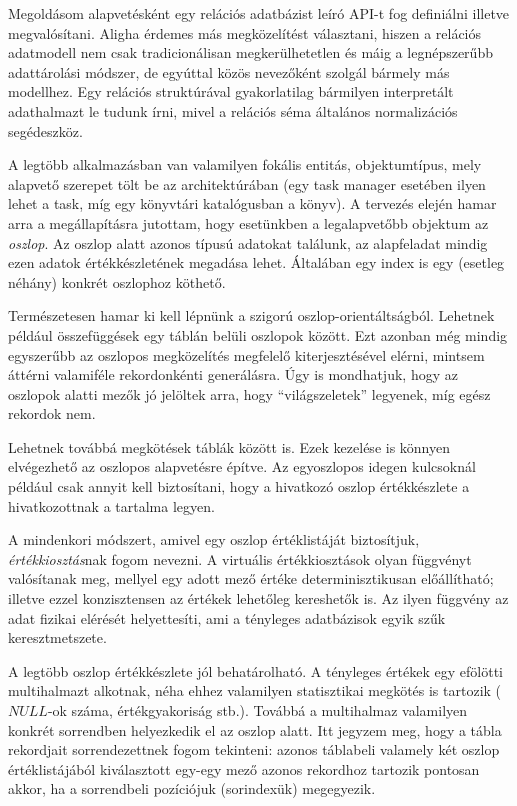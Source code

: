 \documentclass[
    parspace,
    noindent,
    nohyp,
]{elteiktdk}[2023/04/10]
\begin{document}
Megoldásom alapvetésként egy relációs adatbázist leíró API-t fog definiálni illetve megvalósítani.
Aligha érdemes más megközelítést választani,
hiszen a relációs adatmodell nem csak tradicionálisan megkerülhetetlen
és máig a legnépszerűbb adattárolási módszer\cite{Akhtar2023PopularityRO},
de egyúttal közös nevezőként szolgál bármely más modellhez.
Egy relációs struktúrával gyakorlatilag bármilyen interpretált adathalmazt le tudunk írni,
mivel a relációs séma általános normalizációs segédeszköz.

A legtöbb alkalmazásban van valamilyen fokális entitás, objektumtípus,
mely alapvető szerepet tölt be az architektúrában
(egy task manager esetében ilyen lehet a task,
míg egy könyvtári katalógusban a könyv).
A tervezés elején hamar arra a megállapításra jutottam,
hogy esetünkben a legalapvetőbb objektum az \textit{oszlop}.
Az oszlop alatt azonos típusú adatokat találunk,
az alapfeladat mindig ezen adatok értékkészletének megadása lehet.
Általában egy index is egy (esetleg néhány) konkrét oszlophoz köthető.

Természetesen hamar ki kell lépnünk a szigorú oszlop-orientáltságból.
Lehetnek például összefüggések egy táblán belüli oszlopok között.
Ezt azonban még mindig egyszerűbb az oszlopos megközelítés megfelelő kiterjesztésével elérni,
mintsem áttérni valamiféle rekordonkénti generálásra.
Úgy is mondhatjuk, hogy az oszlopok alatti mezők jó jelöltek arra, hogy ``világszeletek'' legyenek,
míg egész rekordok nem.

Lehetnek továbbá megkötések táblák között is.
Ezek kezelése is könnyen elvégezhető az oszlopos alapvetésre építve.
Az egyoszlopos idegen kulcsoknál például csak annyit kell biztosítani,
hogy a hivatkozó oszlop értékkészlete a hivatkozottnak a tartalma legyen.

A mindenkori módszert, amivel egy oszlop értéklistáját biztosítjuk,
\textit{értékkiosztás}nak fogom nevezni.
A virtuális értékkiosztások olyan függvényt valósítanak meg,
mellyel egy adott mező értéke determinisztikusan előállítható;
illetve ezzel konzisztensen az értékek lehetőleg kereshetők is.
Az ilyen függvény az adat fizikai elérését helyettesíti,
ami a tényleges adatbázisok egyik szűk keresztmetszete.

A legtöbb oszlop értékkészlete jól behatárolható.
A tényleges értékek egy efölötti multihalmazt alkotnak,
néha ehhez valamilyen statisztikai megkötés is tartozik ($NULL$-ok száma, értékgyakoriság stb.).
Továbbá a multihalmaz valamilyen konkrét sorrendben helyezkedik el az oszlop alatt.
Itt jegyzem meg, hogy a tábla rekordjait sorrendezettnek fogom tekinteni:
azonos táblabeli valamely két oszlop értéklistájából kiválasztott egy-egy mező
azonos rekordhoz tartozik pontosan akkor, ha a sorrendbeli pozíciójuk (sorindexük) megegyezik.
\end{document}
